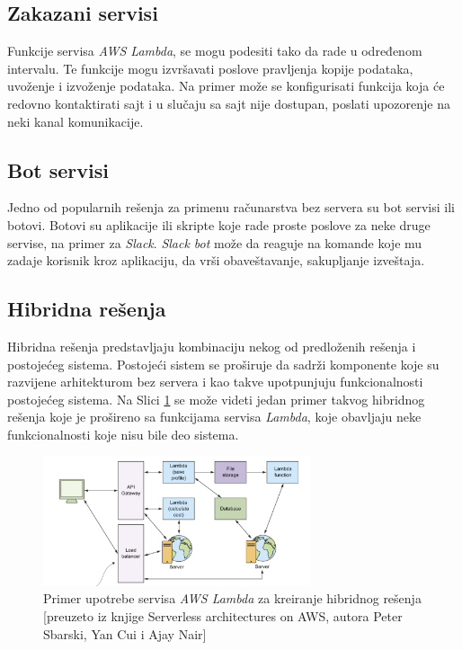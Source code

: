 \documentclass[12pt,oneside]{memoir}
\begin{document}
\subsection{Zakazani servisi}

Funkcije servisa \emph{AWS Lambda}, se mogu podesiti tako da rade u određenom intervalu. Te funkcije mogu izvršavati poslove pravljenja kopije podataka, uvoženje i izvoženje podataka. Na primer može se konfigurisati funkcija koja će redovno kontaktirati sajt i u slučaju sa sajt nije dostupan, poslati upozorenje na neki kanal komunikacije.

\subsection{Bot servisi}

Jedno od popularnih rešenja za primenu računarstva bez servera su bot servisi ili botovi. Botovi su aplikacije ili skripte koje rade proste poslove za neke druge servise, na primer za \emph{Slack}. \emph{Slack bot} može da reaguje na komande koje mu zadaje korisnik kroz aplikaciju, da vrši obaveštavanje, sakupljanje izveštaja. 

\subsection{Hibridna rešenja}

Hibridna rešenja predstavljaju kombinaciju nekog od predloženih rešenja i postojećeg sistema. Postojeći sistem se proširuje da sadrži komponente koje su razvijene arhitekturom bez servera i kao takve upotpunjuju funkcionalnosti postojećeg sistema. Na Slici \ref{fig:HibridnoResenje} se može videti jedan primer takvog hibridnog rešenja koje je prošireno sa funkcijama servisa \emph{Lambda}, koje obavljaju neke funkcionalnosti koje nisu bile deo sistema.

\begin{figure}[!ht]
  \centering
  \includegraphics[width=0.7\textwidth]{Slika 10.png}
  \caption{Primer upotrebe servisa \emph{AWS Lambda} za kreiranje hibridnog rešenja\\\footnotesize[preuzeto iz knjige Serverless architectures on AWS, autora Peter Sbarski, Yan Cui i Ajay Nair]}
  \label{fig:HibridnoResenje}
\end{figure}
\end{document}

